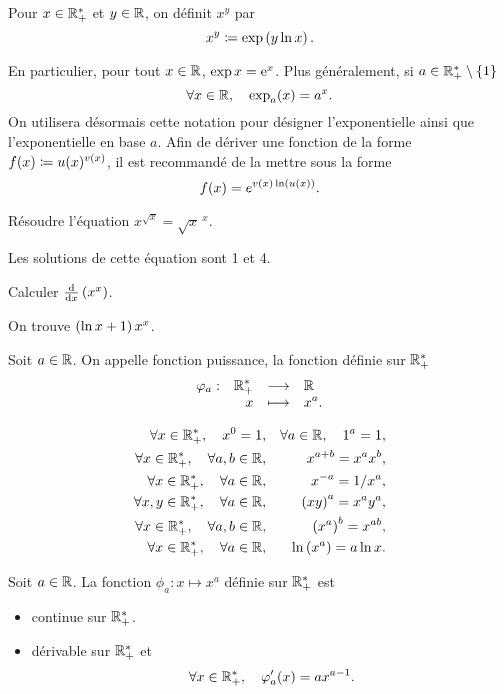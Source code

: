 \documentclass{magnolia}
\begin{document}
\begin{definition}[utile=-3]
Pour $x\in\mathbb{R}_+^*$ et $y\in\mathbb{R}$, on définit $x^y$ par
\[x^y\coloneqq\exp\left(y \ln x\right).\]
\end{definition}

\begin{remarques}
\remarque En particulier, pour tout $x\in\mathbb{R}$, $\exp x={\rm e}^x$. Plus généralement,
   si $a\in\mathbb{R}_+^*\setminus\left\{1\right\}$
   \[\forall x\in\mathbb{R} ,\quad \exp_a(x)=a^x.\]
   On utilisera désormais cette notation pour désigner l'exponentielle ainsi que
   l'exponentielle en base $a$.
\remarque Afin de dériver une fonction de la forme $f(x)\coloneqq u(x)^{v(x)}$, il est recommandé de la mettre sous la forme
  \[f(x)=e^{v(x)\ln\left(u(x)\right)}.\]
\end{remarques}

\begin{exos}
\exemple Résoudre l'équation $x^{\sqrt{x}}=\sqrt{x}^{\ x}$.
  \begin{sol}
  Les solutions de cette équation sont 1 et 4.
  \end{sol}
\exemple Calculer $\frac{{\rm d}}{{\rm d}x}\left(x^x\right)$.
  \begin{sol}
  On trouve $\left(\ln x+1\right)x^x$.
  \end{sol}
\end{exos}

\begin{definition}[utile=-3]
Soit $a\in\mathbb{R}$. On appelle fonction puissance, la fonction définie sur $\mathbb{R}_+^*$
\[\begin{array}[t]{lrcl} \displaystyle{\varphi_a} : & \displaystyle{\mathbb{R}_+^*} & \longrightarrow & \displaystyle{\mathbb{R}} \\ & \displaystyle{x} & \longmapsto & \displaystyle{x^a .} \end{array}\]
\end{definition}

\begin{proposition}[utile=-3]
\begin{eqnarray*}
\forall x\in\mathbb{R}_+^* ,\quad x^0=1, & & \forall a\in\mathbb{R} ,\quad 1^a=1,\\
\forall x\in\mathbb{R}_+^* ,\quad \forall a,b\in\mathbb{R}, & & x^{a+b}=x^a x^b,\\
\forall x\in\mathbb{R}_+^* ,\quad \forall a\in\mathbb{R}, & & x^{-a}=1/x^a,\\
\forall x,y\in\mathbb{R}_+^* ,\quad \forall a\in\mathbb{R}, & & \left(xy\right)^a=x^a y^a,\\
\forall x\in\mathbb{R}_+^* ,\quad \forall a,b\in\mathbb{R}, & & \left(x^a\right)^b=x^{ab},\\
\forall x\in\mathbb{R}_+^* ,\quad \forall a\in\mathbb{R}, & & \ln\left(x^a\right)=a\ln x .
\end{eqnarray*}
\end{proposition}

\begin{proposition}[utile=-3]
Soit $a\in\mathbb{R}$. La fonction $\phi_a:x\mapsto x^a$ définie sur $\mathbb{R}_+^*$ est
\begin{itemize}
\item continue sur $\mathbb{R}_+^*$.
\item dérivable sur $\mathbb{R}_+^*$ et
  \[\forall x\in\mathbb{R}_+^* ,\quad \varphi_a'(x)=a x^{a-1}.\]
\end{itemize}
\end{proposition}
\end{document}
